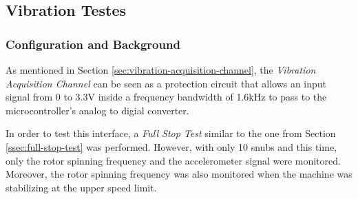 \subsection{Vibration Testes}\label{ssec:vibrationTests}

	\subsubsection{Configuration and Background}

		As mentioned in Section \ref{sec:vibration-acquisition-channel}, the \textit{Vibration Acquisition Channel} can be seen as a protection circuit that allows an input signal from 0 to 3.3V inside a frequency bandwidth of 1.6kHz to pass to the microcontroller's analog to digial converter.
		\par
		In order to test this interface, a \textit{Full Stop Test} similar to the one from Section \ref{ssec:full-stop-test} was performed. However, with only 10 snubs and this time, only the rotor spinning frequency and the accelerometer signal were monitored. Moreover, the rotor spinning frequency was also monitored when the machine was stabilizing at the upper speed limit.

